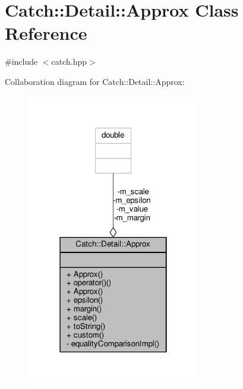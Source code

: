 \hypertarget{class_catch_1_1_detail_1_1_approx}{\section{Catch\-:\-:Detail\-:\-:Approx Class Reference}
\label{class_catch_1_1_detail_1_1_approx}
}


{\ttfamily \#include $<$catch.\-hpp$>$}



Collaboration diagram for Catch\-:\-:Detail\-:\-:Approx\-:
\nopagebreak
\begin{figure}[H]
\begin{center}
\leavevmode
\includegraphics[width=214pt]{class_catch_1_1_detail_1_1_approx__coll__graph}
\end{center}
\end{figure}
